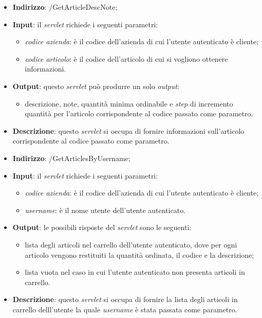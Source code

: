 
\begin{itemize}
	\item \textbf{Indirizzo}: /GetArticleDescNote;
	\item \textbf{Input}: il \textit{servlet} richiede i seguenti parametri:
		\begin{itemize}
			\item \textit{codice azienda}: è il codice dell'azienda di cui l'utente autenticato è cliente;
			\item \textit{codice articolo}: è il codice dell'articolo di cui si vogliono ottenere informazioni.
		\end{itemize}
	\item \textbf{Output}: questo \textit{servlet} può produrre un solo \textit{output}:
		\begin{itemize}
			\item descrizione, note, quantità minima ordinabile e \textit{step} di incremento quantità per l'articolo corrispondente al codice passato come parametro.
		\end{itemize}
	\item \textbf{Descrizione}: questo \textit{servlet} si occupa di fornire informazioni sull'articolo corrispondente al codice passato come parametro. 
\end{itemize}


\begin{itemize}
	\item \textbf{Indirizzo}: /GetArticlesByUsername;
	\item \textbf{Input}: il \textit{servlet} richiede i seguenti parametri:
		\begin{itemize}
			\item \textit{codice azienda}: è il codice dell'azienda di cui l'utente autenticato è cliente;
			\item \textit{username}: è il nome utente dell'utente autenticato.
		\end{itemize}
	\item \textbf{Output}: le possibili risposte del \textit{servlet} sono le seguenti:
		\begin{itemize}
			\item lista degli articoli nel carrello dell'utente autenticato, dove per ogni articolo vengono restituiti la quantità ordinata, il codice e la descrizione;
			\item lista vuota nel caso in cui l'utente autenticato non presenta articoli in carrello.
		\end{itemize}
	\item \textbf{Descrizione}: questo \textit{servlet} si occupa di fornire la lista degli articoli in carrello delll'utente la quale \textit{username} è stata passata come parametro.
\end{itemize}

